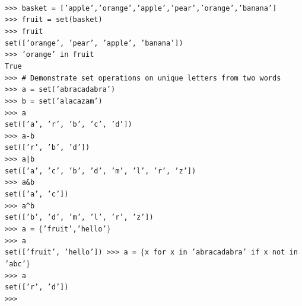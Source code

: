 \documentclass[12pt,a4paper]{article}
\begin{document}
\texttt{\\
>>> basket = ['apple','orange','apple','pear','orange','banana']\\
>>> fruit = set(basket)\\
>>> fruit\\
set(['orange', 'pear', 'apple', 'banana'])\\
>>> 'orange' in fruit\\
True\\
>>> \# Demonstrate set operations on unique letters from two words\\
>>> a = set('abracadabra')\\
>>> b = set('alacazam')\\
>>> a\\
set(['a', 'r', 'b', 'c', 'd'])\\
>>> a-b\\
set(['r', 'b', 'd'])\\
>>> a|b\\
set(['a', 'c', 'b', 'd', 'm', 'l', 'r', 'z'])\\
>>> a\&b\\
set(['a', 'c'])\\
>>> a\textasciicircum b\\
set(['b', 'd', 'm', 'l', 'r', 'z'])\\
>>> a = $\lbrace$'fruit','hello'$\rbrace$\\
>>> a\\
set(['fruit', 'hello'])
>>> a = $\lbrace$x for x in 'abracadabra' if x not in 'abc'$\rbrace$\\
>>> a\\
set(['r', 'd'])\\
>>> \\
}
\end{document}
